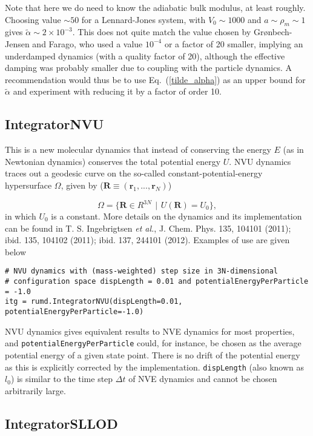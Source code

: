 \documentclass[a4paper]{article}
\begin{document}
Note that here we do need to know the adiabatic bulk modulus, at least roughly. Choosing value $\sim 50$ for a Lennard-Jones system, with $V_0\sim1000$ and $a \sim \rho_m \sim 1$ gives $\tilde\alpha \sim 2 \times 10^{-3}$. This does not quite match the value chosen by Gr{\o}nbech-Jensen and Farago, who used a value $10^{-4}$ or a factor of 20 smaller, implying an underdamped dynamics (with a quality factor of 20), although the effective damping was probably smaller due to coupling with the particle dynamics. A recommendation would thus be to use Eq.~(\ref{tilde_alpha}) as an upper bound for $\tilde\alpha$ and experiment with reducing it by a factor of order 10.

\subsection{IntegratorNVU}
This is a new molecular dynamics that instead of conserving the energy $E$ (as in Newtonian dynamics) conserves the total potential energy $U$. NVU dynamics 
traces out a geodesic curve on the so-called constant-potential-energy hypersurface $\Omega$, given by ($\textbf{R} \equiv (\textbf{r}_{1},...,\textbf{r}_{N})$)

\begin{equation}\label{omega_def}
  \Omega = \{ \textbf{R} \in R^{3N} \,\ | \,\ U(\textbf{R})=U_0 \},
\end{equation}
in which $U_{0}$ is a constant. More details on the dynamics and its implementation can be found 
in T. S. Ingebrigtsen \textit{et al.}, J. Chem. Phys. 135, 104101 (2011); ibid. 135, 104102 (2011); ibid. 137, 244101 (2012). Examples of use are 
given below

\begin{verbatim}
# NVU dynamics with (mass-weighted) step size in 3N-dimensional 
# configuration space dispLength = 0.01 and potentialEnergyPerParticle = -1.0
itg = rumd.IntegratorNVU(dispLength=0.01, potentialEnergyPerParticle=-1.0)
\end{verbatim}
NVU dynamics gives equivalent results to NVE dynamics 
for most properties, and \verb|potentialEnergyPerParticle| could, for instance, be chosen as the average potential energy of a given state point. There is no 
drift of the potential energy as
this is explicitly corrected by the implementation. \verb|dispLength| (also 
known as $l_{0}$) is similar to the time step $\Delta t$ of NVE dynamics and 
cannot be chosen arbitrarily large.

\subsection{IntegratorSLLOD}
\end{document}
